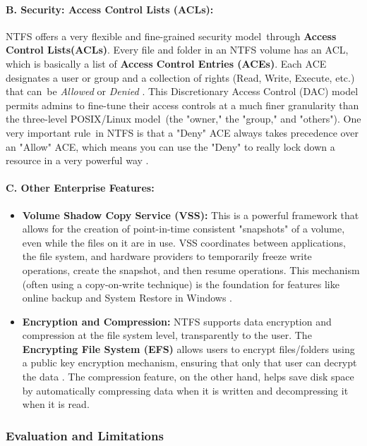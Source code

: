 \documentclass[12pt]{article}
\begin{document}
\paragraph{B. Security: Access Control Lists (ACLs):}
NTFS offers a very flexible and fine-grained security model through \textbf{Access Control Lists(ACLs)}. Every file and folder in an NTFS volume has an ACL, which is basically a list of \textbf{Access Control Entries (ACEs)}. Each ACE designates a user or group and a collection of rights (Read, Write, Execute, etc.) that can be \textit{Allowed} or \textit{Denied} \parencite{SettingAccessControlLists}. This Discretionary Access Control (DAC) model permits admins to fine-tune their access controls at a much finer granularity than the three-level POSIX/Linux model (the "owner," the "group," and "others"). One very important rule in NTFS is that a "Deny" ACE always takes precedence over an "Allow" ACE, which means you can use the "Deny" to really lock down a resource in a very powerful way \parencite{Allison1998}. 

\paragraph{C. Other Enterprise Features:}
\begin{itemize}
    \item \textbf{Volume Shadow Copy Service (VSS):} This is a powerful framework that allows for the creation of point-in-time consistent "snapshots" of a volume, even while the files on it are in use. VSS coordinates between applications, the file system, and hardware providers to temporarily freeze write operations, create the snapshot, and then resume operations. This mechanism (often using a copy-on-write technique) is the foundation for features like online backup and System Restore in Windows \parencite{MicrosoftVSS}.
    \item \textbf{Encryption and Compression:} NTFS supports data encryption and compression at the file system level, transparently to the user. The \textbf{Encrypting File System (EFS)} allows users to encrypt files/folders using a public key encryption mechanism, ensuring that only that user can decrypt the data \parencite{WafaTech2025EFS}. The compression feature, on the other hand, helps save disk space by automatically compressing data when it is written and decompressing it when it is read.
\end{itemize}

\subsubsection{Evaluation and Limitations}
\end{document}
